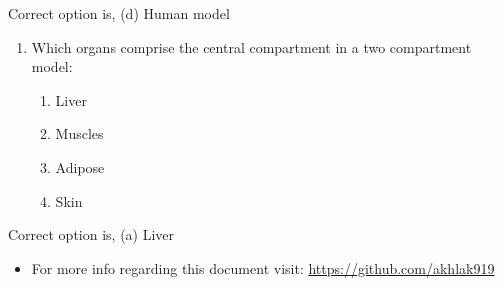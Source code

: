 \documentclass[12pt,a4paper]{article}
\begin{document}
    Correct option is, (d) Human model

    \vspace*{0.5cm}

    \begin{enumerate}[label=20.]
        \item Which organs comprise the central compartment in a two compartment model:
        \begin{enumerate}
            \item Liver
            \item Muscles
            \item Adipose
            \item Skin
        \end{enumerate}
    \end{enumerate}

    Correct option is, (a) Liver

    \begin{itemize}
        \item For more info regarding this document visit: \url{https://github.com/akhlak919}
    \end{itemize}







    


    








    
\end{document}
